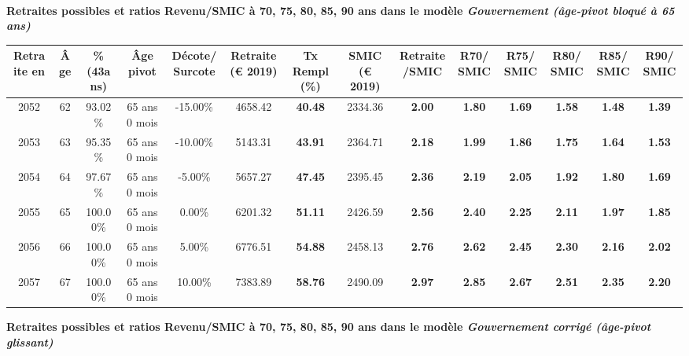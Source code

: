  ~\\{\bf \noindent Retraites possibles et ratios Revenu/SMIC à 70, 75, 80, 85, 90 ans dans le modèle \emph{Gouvernement (âge-pivot bloqué à 65 ans)}}  
 
\begin{adjustbox}{max width=\textwidth} 
\begin{tabular}[htb]{|c|c||c|c|c||c|c||c|c||c|c|c|c|c|} 
\hline 
 Retraite en &  Âge &  \%(43ans) &  Âge pivot &  Décote/Surcote &  Retraite (\euro{} 2019) &  Tx Rempl(\%) &  SMIC (\euro{} 2019) &  Retraite/SMIC &  R70/SMIC &  R75/SMIC &  R80/SMIC &  R85/SMIC &  R90/SMIC \\ 
\hline \hline 
 2052 &  62 &  93.02\% &  65 ans 0 mois &  -15.00\% &  4658.42 &  {\bf 40.48} &  2334.36 &  {\bf 2.00} &  {\bf 1.80} &  {\bf 1.69} &  {\bf 1.58} &  {\bf 1.48} &  {\bf 1.39} \\ 
\hline 
 2053 &  63 &  95.35\% &  65 ans 0 mois &  -10.00\% &  5143.31 &  {\bf 43.91} &  2364.71 &  {\bf 2.18} &  {\bf 1.99} &  {\bf 1.86} &  {\bf 1.75} &  {\bf 1.64} &  {\bf 1.53} \\ 
\hline 
 2054 &  64 &  97.67\% &  65 ans 0 mois &  -5.00\% &  5657.27 &  {\bf 47.45} &  2395.45 &  {\bf 2.36} &  {\bf 2.19} &  {\bf 2.05} &  {\bf 1.92} &  {\bf 1.80} &  {\bf 1.69} \\ 
\hline 
 2055 &  65 &  100.00\% &  65 ans 0 mois &  0.00\% &  6201.32 &  {\bf 51.11} &  2426.59 &  {\bf 2.56} &  {\bf 2.40} &  {\bf 2.25} &  {\bf 2.11} &  {\bf 1.97} &  {\bf 1.85} \\ 
\hline 
 2056 &  66 &  100.00\% &  65 ans 0 mois &  5.00\% &  6776.51 &  {\bf 54.88} &  2458.13 &  {\bf 2.76} &  {\bf 2.62} &  {\bf 2.45} &  {\bf 2.30} &  {\bf 2.16} &  {\bf 2.02} \\ 
\hline 
 2057 &  67 &  100.00\% &  65 ans 0 mois &  10.00\% &  7383.89 &  {\bf 58.76} &  2490.09 &  {\bf 2.97} &  {\bf 2.85} &  {\bf 2.67} &  {\bf 2.51} &  {\bf 2.35} &  {\bf 2.20} \\ 
\hline 
\hline 
\end{tabular} 
\end{adjustbox} 
 
 \vspace{0.1cm} 
{\bf \noindent Retraites possibles et ratios Revenu/SMIC à 70, 75, 80, 85, 90 ans dans le modèle \emph{Gouvernement corrigé (âge-pivot glissant)}}  
 
